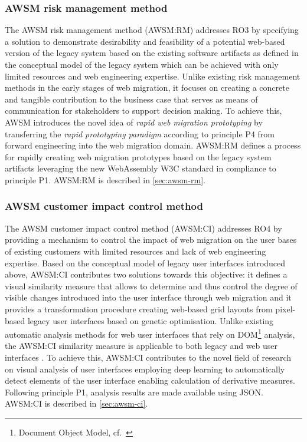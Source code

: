 \hypertarget{awsm-risk-management-method}{%
\subsubsection{AWSM risk management method}\label{awsm-risk-management-method}}

The AWSM risk management method (AWSM:RM) addresses RO3 by specifying a solution to demonstrate desirability and feasibility of a potential web-based version of the legacy system based on the existing software artifacts as defined in the conceptual model of the legacy system which can be achieved with only limited resources and web engineering expertise.
Unlike existing risk management methods in the early stages of web migration, it focuses on creating a concrete and tangible contribution to the business case that serves as means of communication for stakeholders to support decision making.
To achieve this, AWSM introduces the novel idea of \emph{rapid web migration prototyping} \autocite{Heil2018ReWaMP} by transferring the \emph{rapid prototyping paradigm} \autocite{Gordon1995RapidPrototyping} according to principle P4 from forward engineering into the web migration domain.
AWSM:RM defines a process for rapidly creating web migration prototypes based on the legacy system artifacts leveraging the new WebAssembly W3C standard \autocite{W3C2018WebAssembly} in compliance to principle P1.
AWSM:RM is described in \cref{sec:awsm-rm}.

\hypertarget{awsm-customer-impact-control-method}{%
\subsubsection{AWSM customer impact control method}\label{awsm-customer-impact-control-method}}

The AWSM customer impact control method (AWSM:CI) addresses RO4 by providing a mechanism to control the impact of web migration on the user bases of existing customers with limited resources and lack of web engineering expertise.
Based on the conceptual model of legacy user interfaces introduced above, AWSM:CI contributes two solutions towards this objective: it defines a visual similarity measure that allows to determine and thus control the degree of visible changes introduced into the user interface through web migration and it provides a transformation procedure creating web-based grid layouts from pixel-based legacy user interfaces based on genetic optimisation.
Unlike existing automatic analysis methods for web user interfaces that rely on DOM\footnote{Document Object Model, cf.~\autocite{W3C2015DOM}} analysis, the AWSM:CI similarity measure is applicable to both legacy and web user interfaces \autocite{Heil2016Similarity}.
To achieve this, AWSM:CI contributes to the novel field of research on visual analysis of user interfaces employing deep learning to automatically detect elements of the user interface enabling calculation of derivative measures.
Following principle P1, analysis results are made available using JSON.
AWSM:CI is described in \cref{sec:awsm-ci}.

